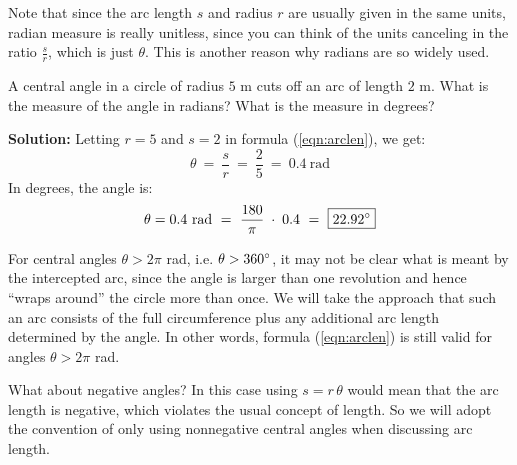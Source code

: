 Note that since the arc length $s$ and radius $r$ are usually given in the same units, radian
measure is really unitless, since you can think of the units canceling in the ratio $\frac{s}{r}$,
which is just $\theta$. This is another reason why radians are so widely used.
\newpage
\begin{exmp}
 A central angle in a circle of radius $5$ m cuts off an arc of length $2$ m.
 What is the measure of the angle in radians? What is the measure in degrees?\vspace{1mm}
 \par\noindent\textbf{Solution:} Letting $r=5$ and $s=2$ in formula (\ref{eqn:arclen}), we get:
 \begin{displaymath}
  \theta ~=~ \frac{s}{r} ~=~ \frac{2}{5} ~=~ \boxed{0.4~\text{rad}}
 \end{displaymath}
 In degrees, the angle is:
 \begin{displaymath}
 \theta = 0.4~\text{rad} ~=~ \frac{180}{\pi} \;\cdot\; 0.4 ~=~ \boxed{22.92^\circ}
 \end{displaymath}
\end{exmp}
\divider
\vspace{1mm}

For central angles $\theta > 2\pi$ rad, i.e. $\theta > 360^\circ$, it may not be clear what is
meant by the intercepted arc, since the angle is larger than one revolution and hence ``wraps
around'' the circle more than once. We will take the approach that such an arc consists of the full
circumference plus any additional arc length determined by the angle. In other words, formula
(\ref{eqn:arclen}) is still valid for angles $\theta > 2\pi$ rad.

What about negative angles? In this case using $s=r\,\theta$ would mean that the arc length is
negative, which violates the usual concept of length. So we will adopt the convention of only using
nonnegative central angles when discussing arc length.

